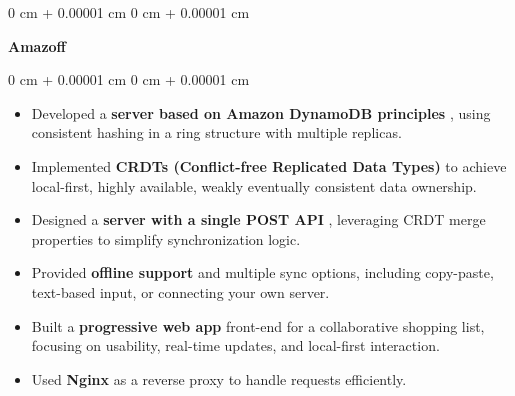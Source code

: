 \documentclass[10pt, letterpaper]{article}
\newenvironment{highlights}{
        \begin{itemize}[
            topsep=0.10 cm,
            parsep=0.10 cm,
            partopsep=0pt,
            itemsep=0pt,
            leftmargin=0 cm + 10pt
        ]
    }{
        \end{itemize}
    } %
\newenvironment{onecolentry}{
        \begin{adjustwidth}{
            0 cm + 0.00001 cm
        }{
            0 cm + 0.00001 cm
        }
    }{
        \end{adjustwidth}
    } %
\newenvironment{twocolentry}[2][]{
        \onecolentry
        \def\secondColumn{#2}
        \setcolumnwidth{\fill, 6.5cm}
        \begin{paracol}{2}
    }{
        \switchcolumn \raggedleft \secondColumn
        \end{paracol}
        \endonecolentry
    } %
\begin{document}
\vspace{0.2 cm}
\begin{twocolentry}{ }\textbf{Amazoff}\end{twocolentry}\vspace{0.10 cm}\begin{onecolentry}\begin{highlights}
\item Developed a  \textbf{server based on Amazon DynamoDB principles} , using consistent hashing in a ring structure with multiple replicas.

\item Implemented  \textbf{CRDTs (Conflict-free Replicated Data Types)}  to achieve local-first, highly available, weakly eventually consistent data ownership.

\item Designed a  \textbf{server with a single POST API} , leveraging CRDT merge properties to simplify synchronization logic.

\item Provided  \textbf{offline support}  and multiple sync options, including copy-paste, text-based input, or connecting your own server.

\item Built a  \textbf{progressive web app}  front-end for a collaborative shopping list, focusing on usability, real-time updates, and local-first interaction.

\item Used  \textbf{Nginx}  as a reverse proxy to handle requests efficiently.

\end{highlights} \end{onecolentry}
\vspace{0.2 cm}
\end{document}
